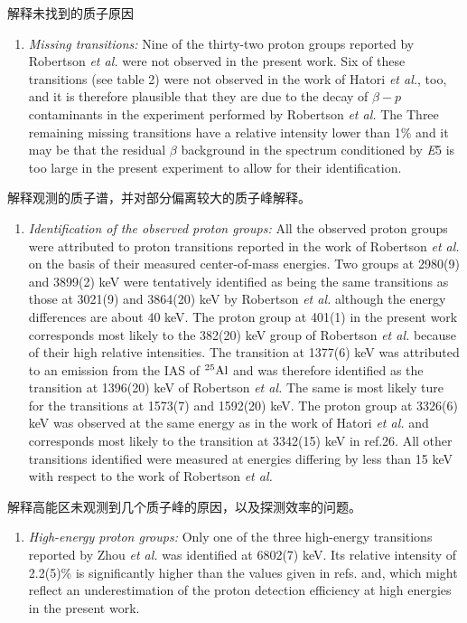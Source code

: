 \documentclass[UTF8]{ctexart}
\begin{document}
解释未找到的质子原因
\begin{enumerate}
    \item \textit{Missing transitions:} Nine of the thirty-two proton groups reported by Robertson \textit{et al.} were not observed in the present work. Six of these transitions (see table 2) were not observed in the work of Hatori \textit{et al.}, too, and it is therefore plausible that they are due to the decay of $\beta-p$ contaminants in the experiment performed by Robertson \textit{et al.} The Three remaining missing transitions have a relative intensity lower than 1\% and it may be that the residual $\beta$ background in the spectrum conditioned by \textit{E}5 is too large in the present experiment to allow for their identification.
\end{enumerate}

解释观测的质子谱，并对部分偏离较大的质子峰解释。
\begin{enumerate}
    \item \textit{Identification of the observed proton groups:} All the observed proton groups were attributed to proton transitions reported in the work of Robertson \textit{et al.} on the basis of their measured center-of-mass energies. Two groups at 2980(9) and 3899(2) keV were tentatively identified as being the same transitions as those at 3021(9) and 3864(20) keV by Robertson \textit{et al.} although the energy differences are about 40 keV. The proton group at 401(1) in the present work corresponds most likely to the 382(20) keV group of Robertson \textit{et al.} because of their high relative intensities. The transition at 1377(6) keV was attributed to an emission from the IAS of $^{25}\textnormal{Al}$ and was therefore identified as the transition at 1396(20) keV of Robertson \textit{et al.} The same is most likely ture for the transitions at 1573(7) and 1592(20) keV. The proton group at 3326(6) keV was observed at the same energy as in the work of Hatori \textit{et al.} and corresponds most likely to the transition at 3342(15) keV in ref.26. All other transitions identified were measured at energies differing by less than 15 keV with respect to the work of Robertson \textit{et al.}
\end{enumerate}

解释高能区未观测到几个质子峰的原因，以及探测效率的问题。
\begin{enumerate}
    \item \textit{High-energy proton groups:} Only one of the three high-energy transitions reported by Zhou \textit{et al.} was identified at 6802(7) keV. Its relative intensity of 2.2(5)\% is significantly higher than the values given in refs. and, which might reflect an underestimation of the proton detection efficiency at high energies in the present work.
\end{enumerate}
\end{document}
